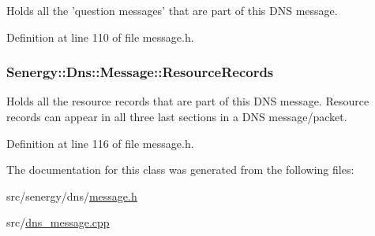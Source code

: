 Holds all the 'question messages' that are part of this D\-N\-S message. 



Definition at line 110 of file message.\-h.

\hypertarget{class_senergy_1_1_dns_1_1_message_a9c5d3af474d43d46dd1a6992567fc38b}{
\subsubsection[{Resource\-Records}]{ Senergy\-::\-Dns\-::\-Message\-::\-Resource\-Records}}\label{class_senergy_1_1_dns_1_1_message_a9c5d3af474d43d46dd1a6992567fc38b}


Holds all the resource records that are part of this D\-N\-S message. Resource records can appear in all three last sections in a D\-N\-S message/packet. 



Definition at line 116 of file message.\-h.



The documentation for this class was generated from the following files\-:\begin{DoxyCompactItemize}
\item 
src/senergy/dns/\hyperlink{message_8h}{message.\-h}\item 
src/\hyperlink{dns__message_8cpp}{dns\-\_\-message.\-cpp}\end{DoxyCompactItemize}
